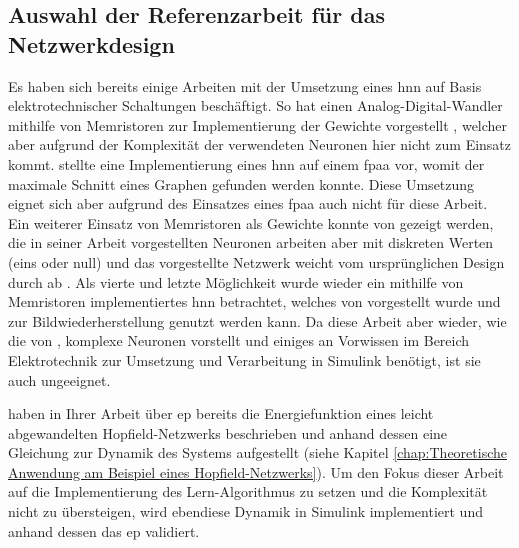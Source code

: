 \subsection{Auswahl der Referenzarbeit für das Netzwerkdesign}
\label{chap:Auswahl der Referenzarbeit für das Netzwerkdesign}

Es haben sich bereits einige Arbeiten mit der Umsetzung eines \ac{hnn} auf Basis elektrotechnischer Schaltungen beschäftigt. So hat \zb \citeauthor{Guo2015} einen Analog-Digital-Wandler mithilfe von Memristoren zur Implementierung der Gewichte vorgestellt \cite{Guo2015}, welcher aber aufgrund der Komplexität der verwendeten Neuronen hier nicht zum Einsatz kommt. \citeauthor{Mathews2023} stellte \citeyear{Mathews2023} eine Implementierung eines \ac{hnn} auf einem \ac{fpaa} vor, womit der maximale Schnitt eines Graphen gefunden werden konnte. Diese Umsetzung eignet sich aber aufgrund des Einsatzes eines \ac{fpaa} auch nicht für diese Arbeit. Ein weiterer Einsatz von Memristoren als Gewichte konnte von \citeauthor{Hu2015} gezeigt werden, die in seiner Arbeit vorgestellten Neuronen arbeiten aber mit diskreten Werten (eins oder null) und das vorgestellte Netzwerk weicht vom ursprünglichen Design durch \citeauthor{Hopfield1982} ab \cite{Hu2015}. Als vierte und letzte Möglichkeit wurde wieder ein mithilfe von Memristoren implementiertes \ac{hnn} betrachtet, welches \citeyear{Hong2020} von \citeauthor{Hong2020} vorgestellt wurde und zur Bildwiederherstellung genutzt werden kann. Da diese Arbeit aber wieder, wie die von \cite{Guo2015}, komplexe Neuronen vorstellt und einiges an Vorwissen im Bereich Elektrotechnik zur Umsetzung und Verarbeitung in Simulink benötigt, ist sie auch ungeeignet.

\citeauthor{Scellier2017} haben in Ihrer Arbeit über \ac{ep} bereits die Energiefunktion eines leicht abgewandelten Hopfield-Netzwerks beschrieben und anhand dessen eine Gleichung zur Dynamik des Systems aufgestellt (siehe Kapitel \ref{chap:Theoretische Anwendung am Beispiel eines Hopfield-Netzwerks}). Um den Fokus dieser Arbeit auf die Implementierung des Lern-Algorithmus zu setzen und die Komplexität nicht zu übersteigen, wird ebendiese Dynamik in Simulink implementiert und anhand dessen das \ac{ep} validiert.
